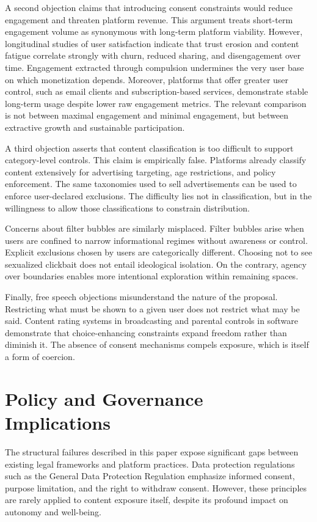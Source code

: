 \documentclass[11pt,oneside]{article}
\begin{document}
A second objection claims that introducing consent constraints would reduce engagement and threaten platform revenue. This argument treats short-term engagement volume as synonymous with long-term platform viability. However, longitudinal studies of user satisfaction indicate that trust erosion and content fatigue correlate strongly with churn, reduced sharing, and disengagement over time. Engagement extracted through compulsion undermines the very user base on which monetization depends. Moreover, platforms that offer greater user control, such as email clients and subscription-based services, demonstrate stable long-term usage despite lower raw engagement metrics. The relevant comparison is not between maximal engagement and minimal engagement, but between extractive growth and sustainable participation.

A third objection asserts that content classification is too difficult to support category-level controls. This claim is empirically false. Platforms already classify content extensively for advertising targeting, age restrictions, and policy enforcement. The same taxonomies used to sell advertisements can be used to enforce user-declared exclusions. The difficulty lies not in classification, but in the willingness to allow those classifications to constrain distribution.

Concerns about filter bubbles are similarly misplaced. Filter bubbles arise when users are confined to narrow informational regimes without awareness or control. Explicit exclusions chosen by users are categorically different. Choosing not to see sexualized clickbait does not entail ideological isolation. On the contrary, agency over boundaries enables more intentional exploration within remaining spaces.

Finally, free speech objections misunderstand the nature of the proposal. Restricting what must be shown to a given user does not restrict what may be said. Content rating systems in broadcasting and parental controls in software demonstrate that choice-enhancing constraints expand freedom rather than diminish it. The absence of consent mechanisms compels exposure, which is itself a form of coercion.

\section{Policy and Governance Implications}

The structural failures described in this paper expose significant gaps between existing legal frameworks and platform practices. Data protection regulations such as the General Data Protection Regulation emphasize informed consent, purpose limitation, and the right to withdraw consent. However, these principles are rarely applied to content exposure itself, despite its profound impact on autonomy and well-being.
\end{document}
